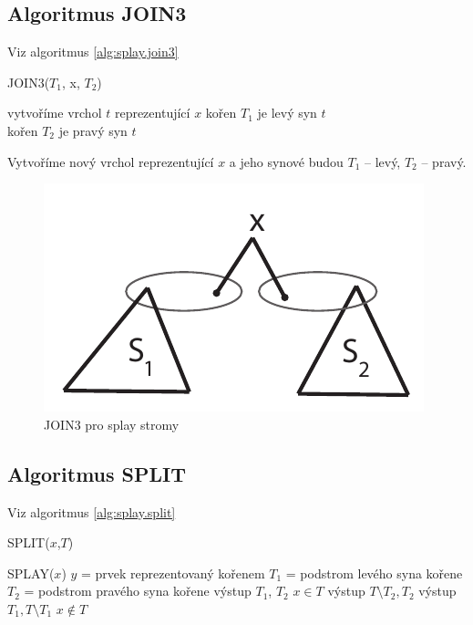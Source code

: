 \subsection{Algoritmus JOIN3}

Viz algoritmus \ref{alg:splay.join3}

\begin{algorithm}[!htb]
\caption{JOIN3($T_1$, x, $T_2$)}
\label{alg:splay.join3}
\begin{algorithmic}
\STATE vytvoříme vrchol $t$ reprezentující $x$
\STATE kořen $T_1$ je levý syn $t$ \\
\STATE kořen $T_2$ je pravý syn $t$
\end{algorithmic}
\end{algorithm}

Vytvoříme nový vrchol reprezentující $x$ a jeho synové budou $T_1$ -- levý,
$T_2$ -- pravý.

\begin{figure}[!htb]
\centering\includegraphics{pics/splay-join3}
\caption{JOIN3 pro splay stromy}
\label{splay-join3}
\end{figure}

\subsection{Algoritmus SPLIT}

Viz algoritmus \ref{alg:splay.split}

\begin{algorithm}[!htb]
\caption{SPLIT($x$,$T$)}
\label{alg:splay.split}
\begin{algorithmic}
\STATE SPLAY($x$)
\STATE $y$ = prvek reprezentovaný kořenem
\STATE $T_1$ = podstrom levého syna kořene
\STATE $T_2$ = podstrom pravého syna kořene
  \STATE výstup $T_1$, $T_2$
  \STATE $x \in T$
  \STATE výstup $T \setminus T_2, T_2$
\ELSE
  \STATE výstup $T_1, T \setminus T_1$
\ENDIF
\STATE $x \not\in T$
\end{algorithmic}
\end{algorithm}


